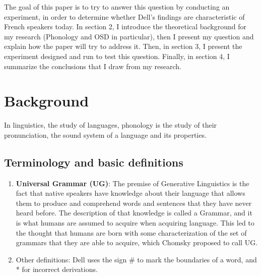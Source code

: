 \documentclass{article}
\begin{document}
The goal of this paper is to try to answer this question by conducting an experiment, in order to determine whether Dell's findings are characteristic of  French speakers today. In section 2, I introduce the theoretical background for my research (Phonology and OSD in particular),  then I present my question and explain how the paper will try to address it. Then,  in section 3,  I present the experiment designed and run to test this question. Finally,  in section 4,  I summarize the conclusions that I draw from my research.

\clearpage
\section{Background} %
In linguistics, the study of languages, phonology is the study of their pronunciation,  the sound system of a language and its properties.

\subsection{Terminology and basic definitions} %
\begin{enumerate}

  \item \textbf{Universal Grammar (UG)}: The premise of Generative Linguistics is the fact that native speakers have knowledge about
their language that allows them to produce and comprehend words and sentences that they have never heard before. The description of that knowledge is called a Grammar, and it is what humans are assumed to acquire when acquiring language. This led to the thought that humans are born with some characterization of the set of grammars that they are able to acquire,  which Chomsky proposed to call UG.
  \item Other definitions: Dell uses the sign \# to mark the boundaries of a word, and * for incorrect derivations.

\end{enumerate}


\end{document}
